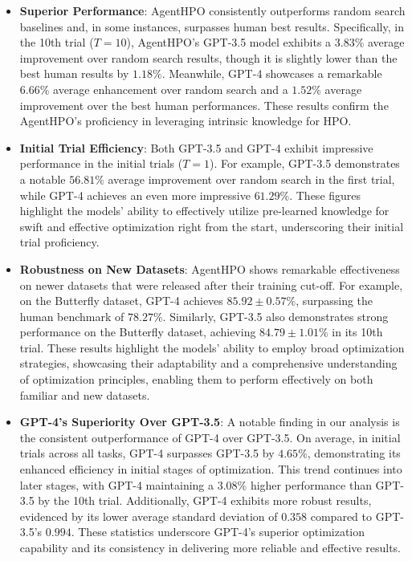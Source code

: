 \documentclass{article}
\begin{document}
\begin{itemize}[leftmargin=*]
\item \textbf{Superior Performance}: AgentHPO consistently outperforms random search baselines and, in some instances, surpasses human best results. Specifically, in the 10th trial ($T=10$), AgentHPO's GPT-3.5 model exhibits a \(3.83\%\) average improvement over random search results, though it is slightly lower than the best human results by \(1.18\%\). Meanwhile, GPT-4 showcases a remarkable \(6.66\%\) average enhancement over random search and a \(1.52\%\) average improvement over the best human performances. These results confirm the AgentHPO's proficiency in leveraging intrinsic knowledge for HPO.

\item \textbf{Initial Trial Efficiency}: Both GPT-3.5 and GPT-4 exhibit impressive performance in the initial trials ($T=1$). For example, GPT-3.5 demonstrates a notable \(56.81\%\) average improvement over random search in the first trial, while GPT-4 achieves an even more impressive \(61.29\%\). These figures highlight the models' ability to effectively utilize pre-learned knowledge for swift and effective optimization right from the start, underscoring their initial trial proficiency.

\item \textbf{Robustness on New Datasets}: AgentHPO shows remarkable effectiveness on newer datasets that were released after their training cut-off. For example, on the Butterfly dataset, GPT-4 achieves $85.92\pm0.57\%$, surpassing the human benchmark of $78.27\%$. Similarly, GPT-3.5 also demonstrates strong performance on the Butterfly dataset, achieving $84.79\pm1.01\%$ in its 10th trial. These results highlight the models' ability to employ broad optimization strategies, showcasing their adaptability and a comprehensive understanding of optimization principles, enabling them to perform effectively on both familiar and new datasets.

\item \textbf{GPT-4's Superiority Over GPT-3.5}: A notable finding in our analysis is the consistent outperformance of GPT-4 over GPT-3.5. On average, in initial trials across all tasks, GPT-4 surpasses GPT-3.5 by \(4.65\%\), demonstrating its enhanced efficiency in initial stages of optimization. This trend continues into later stages, with GPT-4 maintaining a \(3.08\%\) higher performance than GPT-3.5 by the 10th trial. Additionally, GPT-4 exhibits more robust results, evidenced by its lower average standard deviation of \(0.358\) compared to GPT-3.5's \(0.994\). These statistics underscore GPT-4's superior optimization capability and its consistency in delivering more reliable and effective results.

\end{itemize}
\end{document}

